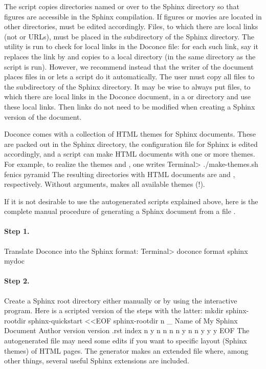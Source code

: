 \documentclass{book}
\begin{document}
The  script copies directories named  or
 over to the Sphinx directory so that figures are accessible
in the Sphinx compilation.  If figures or movies are located in other
directories,  must be edited accordingly.  Files,
to which there are local links (not  or  URLs), must be
placed in the  subdirectory of the Sphinx directory. The
utility  is run to check for local links
in the Doconce file: for each such link, say  it
replaces the link by  and copies
 to a local  directory (in the same
directory as the script is run).  However, we recommend instead that
the writer of the document places files in  or lets a script
do it automatically. The user must copy all  files to the
 subdirectory of the Sphinx directory.  It may be wise to
always put files, to which there are local links in the Doconce
document, in a  or  directory and use these
local links. Then links do not need to be modified when creating a
Sphinx version of the document.

Doconce comes with a collection of HTML themes for Sphinx documents.
These are packed out in the Sphinx directory, the 
configuration file for Sphinx is edited accordingly, and a script
 can make HTML documents with one or more themes.
For example,
to realize the themes  and , one writes
\bsys
Terminal> ./make-themes.sh fenics pyramid
\esys
The resulting directories with HTML documents are 
and , respectively. Without arguments,
 makes all available themes (!).

If it is not desirable to use the autogenerated scripts explained
above, here is the complete manual procedure of generating a
Sphinx document from a file .

\paragraph{Step 1.}
Translate Doconce into the Sphinx format:
\bsys
Terminal> doconce format sphinx mydoc
\esys

\paragraph{Step 2.}
Create a Sphinx root directory
either manually or by using the interactive 
program. Here is a scripted version of the steps with the latter:
\bsys
mkdir sphinx-rootdir
sphinx-quickstart <<EOF
sphinx-rootdir
n
_
Name of My Sphinx Document
Author
version
version
.rst
index
n
y
n
n
n
n
y
n
n
y
y
y
EOF
\esys
The autogenerated  file
may need some edits if you want to specific layout (Sphinx themes)
of HTML pages. The  generator makes an extended 
file where, among other things, several useful Sphinx extensions
are included.
\end{document}
